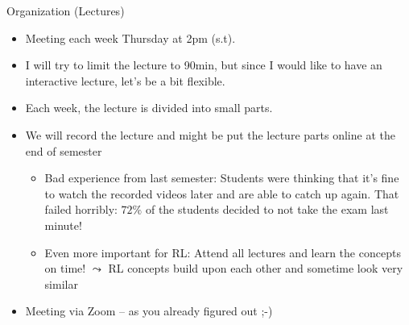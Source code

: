 \begin{frame}[c]{Organization (Lectures)}
	
	\begin{itemize}
		\item Meeting each week Thursday at 2pm (s.t).
		\pause
		\item I will try to limit the lecture to 90min, but since I would like to have an interactive lecture, let's be a bit flexible.
		\pause
		\item Each week, the lecture is divided into small parts.
		\pause
		\item We will record the lecture and might be put the lecture parts online at the end of semester
		\pause
		\begin{itemize}
			\item Bad experience from last semester: Students were thinking that it's fine to watch the recorded videos later and are able to catch up again. That failed horribly: $72\%$ of the students decided to not take the exam last minute!
			\pause
			\item Even more important for RL: Attend all lectures and learn the concepts on time!\newline
			$\leadsto$ RL concepts build upon each other and sometime look very similar
		\end{itemize}
		\pause
		\item Meeting via Zoom -- as you already figured out ;-)
	\end{itemize}
	
\end{frame}

